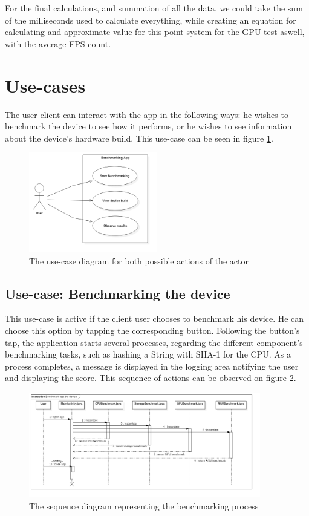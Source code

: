 \documentclass[a4paper,10pt]{report}
\begin{document}
 For the final calculations, and summation of all the data, we could take the sum of the milliseconds used to calculate everything, while creating an equation for calculating and approximate value for this point system for the GPU test aswell, with the average FPS count.
 
 \section{Use-cases}
  The user client can interact with the app in the following ways: he wishes to benchmark the device to see how it performs, or he wishes to see information about the device's hardware build. This use-case can be seen in figure \ref{fig:useCaseDiag1}.
  
 \begin{figure}[h]
  \centering
  \includegraphics[width=0.5\textwidth]{UseCaseDiagram1.png}
  \caption{The use-case diagram for both possible actions of the actor}
  \label{fig:useCaseDiag1}
 \end{figure}
 
 \subsection{Use-case: Benchmarking the device}
 This use-case is active if the client user chooses to benchmark his device. He can choose this option by tapping the corresponding button. Following the button's tap, the application starts several processes, regarding the different component's benchmarking tasks, such as hashing a String with SHA-1 for the CPU. As a process completes, a message is displayed in the logging area notifying the user and displaying the score. This sequence of actions can be observed on figure \ref{fig:benchSeqDiag1}.
 
 \begin{figure}[h]
  \centering
  \includegraphics[width=0.9\textwidth]{SequenceDiagram_Benchmark.png}
  \caption{The sequence diagram representing the benchmarking process}
  \label{fig:benchSeqDiag1}
 \end{figure}
 
\end{document}
